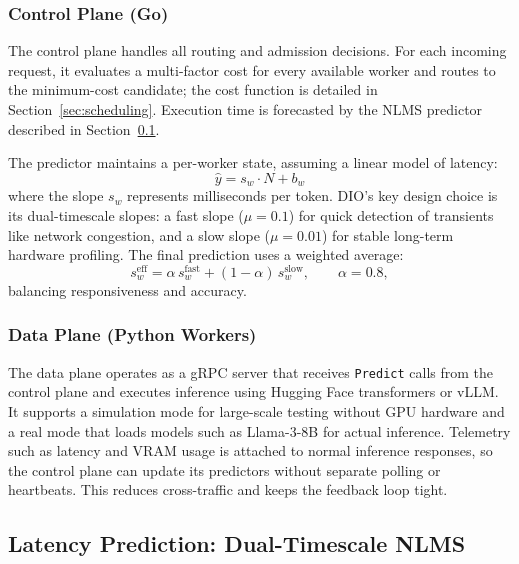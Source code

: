 \documentclass[10pt,twocolumn,letterpaper]{article}
\begin{document}
\subsubsection{Control Plane (Go)}

The control plane handles all routing and admission decisions. For each incoming request, it evaluates a multi-factor cost for every available worker and routes to the minimum-cost candidate; the cost function is detailed in Section~\ref{sec:scheduling}. Execution time is forecasted by the NLMS predictor described in Section~\ref{sec:nlms-model}.

The predictor maintains a per-worker state, assuming a linear model of latency:
\[ \hat{y} = s_w \cdot N + b_w \]
where the slope $s_w$ represents milliseconds per token. DIO's key design choice is its dual-timescale slopes: a fast slope ($\mu=0.1$) for quick detection of transients like network congestion, and a slow slope ($\mu=0.01$) for stable long-term hardware profiling. The final prediction uses a weighted average:
\begin{equation}
    s^{\text{eff}}_w = \alpha \, s^{\text{fast}}_w + (1 - \alpha) \, s^{\text{slow}}_w, \qquad \alpha = 0.8,
    \label{eq:dual-timescale}
\end{equation}
balancing responsiveness and accuracy.

\subsubsection{Data Plane (Python Workers)}

The data plane operates as a gRPC server that receives \texttt{Predict} calls from the control plane and executes inference using Hugging Face transformers or vLLM. It supports a simulation mode for large-scale testing without GPU hardware and a real mode that loads models such as Llama-3-8B for actual inference. Telemetry such as latency and VRAM usage is attached to normal inference responses, so the control plane can update its predictors without separate polling or heartbeats. This reduces cross-traffic and keeps the feedback loop tight.

\subsection{Latency Prediction: Dual-Timescale NLMS}
\label{sec:nlms-model}
\end{document}
